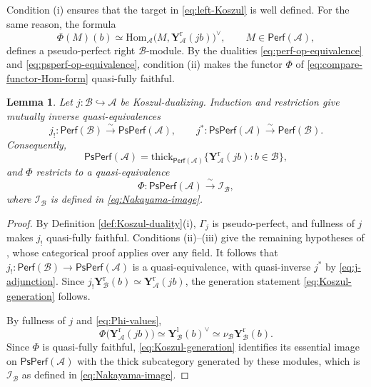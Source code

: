 \documentclass[11pt,letterpaper,reqno]{amsart}
\theoremstyle{plain}
\newtheorem{lemma}[lemma]{Lemma}
\theoremstyle{definition}
\theoremstyle{plain}
\theoremstyle{definition}
\numberwithin{equation}{section}
\begin{document}
Condition (i) ensures that the target in \eqref{eq:left-Koszul} is well defined.
For the same reason, the formula
\begin{equation}\label{eq:Phi-values}
\Phi(M)(b)\simeq\mathrm{Hom}_{\mathscr A}\bigl(M,\mathbf Y_{\mathscr A}^{\mathrm r}(jb)\bigr)^\vee,
\qquad M\in\mathsf{Perf}(\mathscr A),
\end{equation}
defines a pseudo-perfect right $\mathscr B$-module.
By the dualities \eqref{eq:perf-op-equivalence} and \eqref{eq:psperf-op-equivalence}, condition (ii) makes the functor $\Phi$ of \eqref{eq:compare-functor-Hom-form} quasi-fully faithful.

\begin{lemma}\label{lem:Koszul-generation}
Let $j:\mathscr B\hookrightarrow\mathscr A$ be Koszul-dualizing.
Induction and restriction give mutually inverse quasi-equivalences
\begin{equation}\label{eq:j_!-perfB-psperfA}
j_!:\mathsf{Perf}(\mathscr B)\xrightarrow{\;\sim\;}\mathsf{PsPerf}(\mathscr A),
\qquad
j^*:\mathsf{PsPerf}(\mathscr A)\xrightarrow{\;\sim\;}\mathsf{Perf}(\mathscr B).
\end{equation}
Consequently,
\begin{equation}\label{eq:Koszul-generation}
\mathsf{PsPerf}(\mathscr A)
=\mathrm{thick}_{\mathsf{Perf}(\mathscr A)}
\{\mathbf Y_{\mathscr A}^{\mathrm r}(jb):b\in\mathscr B\},
\end{equation}
and $\Phi$ restricts to a quasi-equivalence
\begin{equation}\label{eq:Phi-pseudo-perfect}
\Phi:\mathsf{PsPerf}(\mathscr A)\xrightarrow{\;\sim\;}\mathscr I_{\mathscr B},
\end{equation}
where $\mathscr I_{\mathscr B}$ is defined in \eqref{eq:Nakayama-image}.
\end{lemma}
\begin{proof}
By Definition \ref{def:Koszul-duality}(i), $\Gamma_j$ is pseudo-perfect, and fullness of $j$ makes $j_!$ quasi-fully faithful.
Conditions (ii)--(iii) give the remaining hypotheses of \cite[Proposition 9.3]{Efimov2017}, whose categorical proof applies over any field.
It follows that $j_!:\mathsf{Perf}(\mathscr B)\to\mathsf{PsPerf}(\mathscr A)$ is a quasi-equivalence, with quasi-inverse $j^*$ by \eqref{eq:j-adjunction}.
Since $j_!\mathbf Y_{\mathscr B}^{\mathrm r}(b)\simeq\mathbf Y_{\mathscr A}^{\mathrm r}(jb)$, the generation statement \eqref{eq:Koszul-generation} follows.

By fullness of $j$ and \eqref{eq:Phi-values},
\begin{equation}\label{eq:Phi-representables}
\Phi\bigl(\mathbf Y_{\mathscr A}^{\mathrm r}(jb)\bigr)
\simeq\mathbf Y_{\mathscr B}^{\mathrm l}(b)^\vee
\simeq\nu_{\mathscr B}\mathbf Y_{\mathscr B}^{\mathrm r}(b).
\end{equation}
Since $\Phi$ is quasi-fully faithful, \eqref{eq:Koszul-generation} identifies its essential image on $\mathsf{PsPerf}(\mathscr A)$ with the thick subcategory generated by these modules, which is $\mathscr I_{\mathscr B}$ as defined in \eqref{eq:Nakayama-image}.
\end{proof}
\end{document}
